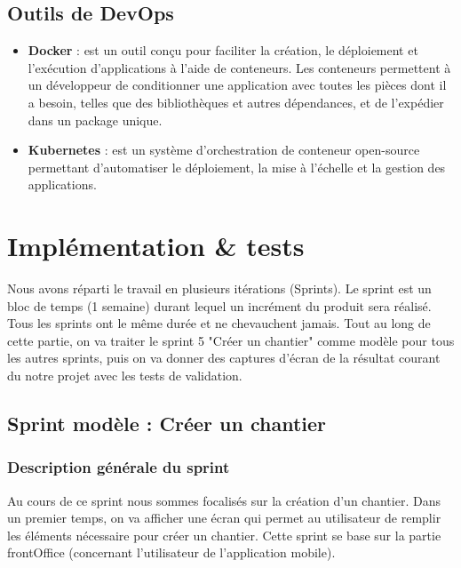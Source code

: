 \subsection{Outils de DevOps}

\begin{itemize}
\item \textbf{Docker} : est un outil con\c{c}u pour faciliter la cr\'eation, le d\'eploiement et l'ex\'ecution d'applications \`a l'aide de conteneurs. Les conteneurs permettent \`a un d\'eveloppeur de conditionner une application avec toutes les pi\`eces dont il a besoin, telles que des biblioth\`eques et autres d\'ependances, et de l'exp\'edier dans un package unique.

\item \textbf{Kubernetes} : est un syst\`eme d'orchestration de conteneur open-source permettant d'automatiser le d\'eploiement, la mise \`a l'\'echelle et la gestion des applications.

\end{itemize}

\section{Impl\'ementation \& tests}

Nous avons r\'eparti le travail en plusieurs it\'erations (Sprints). Le sprint est un bloc de temps (1 semaine) durant lequel un incr\'ement du produit sera r\'ealis\'e. Tous les sprints ont le m\^eme dur\'ee et ne chevauchent jamais. Tout au long de cette partie, on va traiter le sprint 5 "Cr\'eer un chantier" comme mod\`ele pour tous les autres sprints, puis on va donner des captures d'\'ecran de la r\'esultat courant du notre projet avec les tests de validation.

\subsection{Sprint mod\`ele : Cr\'eer un chantier}

\subsubsection{Description g\'en\'erale du sprint}

Au cours de ce sprint nous sommes focalis\'es sur la cr\'eation d'un chantier. Dans un premier temps, on va afficher une \'ecran qui permet au utilisateur de remplir les \'el\'ements n\'ecessaire pour cr\'eer un chantier. Cette sprint se base sur la partie frontOffice (concernant l'utilisateur de l'application mobile).

